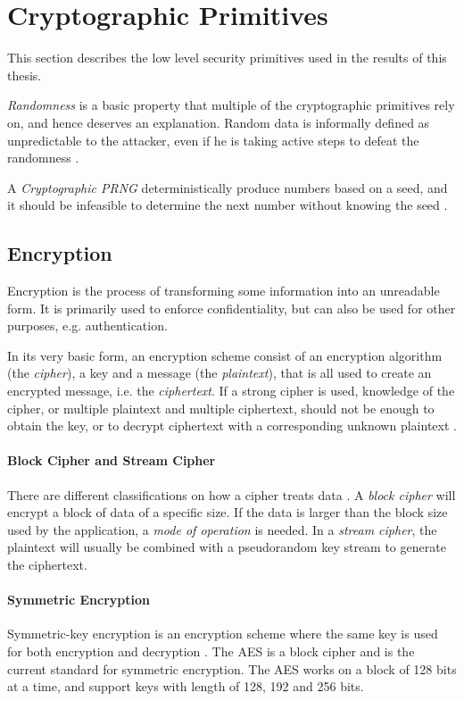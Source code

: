 \documentclass[pdftex,english,10pt,b5paper,twoside]{book}
\begin{document}
\section{Cryptographic Primitives}

This section describes the low level security primitives used in the results of
this thesis.

\emph{Randomness} is a basic property that multiple of the cryptographic
primitives rely on, and hence deserves an explanation. Random data is
informally defined as unpredictable to the attacker, even if he is taking
active steps to defeat the randomness \cite[p. 137]{schneier}.

A \emph{Cryptographic \ac{PRNG}} deterministically produce numbers based on a
seed, and it should be infeasible to determine the next number without knowing
the seed \cite[p. 140]{schneier}.

\subsection{Encryption}

Encryption is the process of transforming some information into an unreadable
form. It is primarily used to enforce confidentiality, but can also be
used for other purposes, e.g. authentication.

In its very basic form, an encryption scheme consist of an encryption algorithm
(the \emph{cipher}), a key and a message (the \emph{plaintext}), that is all
used to create an encrypted message, i.e. the \emph{ciphertext}. If a strong
cipher is used, knowledge of the cipher, or multiple plaintext and multiple
ciphertext, should not be enough to obtain the key, or to decrypt ciphertext
with a corresponding unknown plaintext \cite{schneier}.

\paragraph{Block Cipher and Stream Cipher} There are different classifications
on how a cipher treats data \cite[p. 32]{stallings}. A \emph{block cipher} will
encrypt a block of data of a specific size. If the data is larger than the
block size used by the application, a \emph{mode of operation} is needed. In a
\emph{stream cipher}, the plaintext will usually be combined with a pseudorandom key
stream to generate the ciphertext.

\paragraph{Symmetric Encryption} Symmetric-key encryption is an encryption scheme
where the same key is used for both encryption and decryption \cite[p.
32]{stallings}. The \ac{AES} is a block cipher and is the current standard for
symmetric encryption. The \ac{AES} works on a block of 128 bits at a time,
and support keys with length of 128, 192 and 256 bits.
\end{document}
